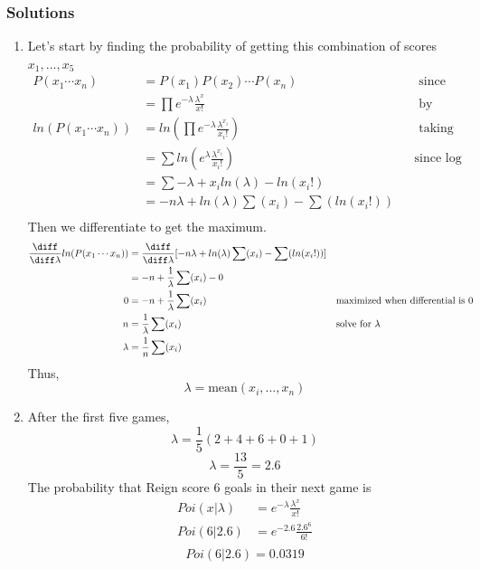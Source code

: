 \documentclass{article}
\begin{document}
\begin{aprob}
    \subsubsection*{Solutions}
    \begin{enumerate}
        \item Let's start by finding the probability of getting this combination of scores $x_1, ... , x_5$
        \begin{align*}
            P(x_1\cdots x_n) &= P(x_1)P(x_2)\cdots P(x_n) & &\text{ since scores are iid} \\
            &= \prod e^{-\lambda}\frac{\lambda^x}{x!} & &\text{ by definition} \\
            ln( P( x_1 \cdots x_n ) ) &= ln( \prod e^{-\lambda}\frac{\lambda^{x_i}}{x_i!} ) & &\text{ taking natural log of both sides}\\
            &= \sum ln( e^\lambda \frac{\lambda^{x_i}}{x_i!} ) & &\text{since log turns product to sum}\\
            &= \sum  -\lambda + x_i ln( \lambda ) - ln( x_i! )  \\
            &= -n \lambda + ln(\lambda) \sum ( x_i ) - \sum( ln(x_i!) ) \\
        \end{align*}
        Then we differentiate to get the maximum.
        \begin{align*}
            \frac{\diff}{\diff \lambda} ln( P( x_1 \cdots x_n ) ) &= \frac{\diff}{\diff \lambda} \lbrack -n \lambda + ln(\lambda) \sum ( x_i ) - \sum( ln(x_i!) ) \rbrack\\
            &= -n + \frac{1}{\lambda} \sum ( x_i )- 0 \\
            0 &= -n + \frac{1}{\lambda} \sum ( x_i ) & & \text{maximized when differential is 0}\\
            n &= \frac{1}{\lambda} \sum ( x_i ) & & \text{solve for }\lambda \\
            \lambda &= \frac{1}{n} \sum ( x_i ) \\
        \end{align*}
        Thus,
        $$ \boxed{\lambda =  \text{mean} (x_i, ... , x_n)} $$
        \newpage

        \item After the first five games,
        \[ \lambda = \frac{1}{5} (2+4+6+0+1) \]
        $$ \boxed {\lambda = \frac{13}{5} = 2.6 }$$
        The probability that Reign score 6 goals in their next game is
        \begin{align*}
            Poi(x|\lambda) &= e^{-\lambda} \frac{\lambda^x}{x!} \\
            Poi(6|2.6) &= e^{-2.6} \frac{2.6^6}{6!} \\
        \end{align*}
        $$ \boxed { Poi(6|2.6) = 0.0319 } $$
        \newpage


\end{enumerate}
\end{aprob}
\end{document}
